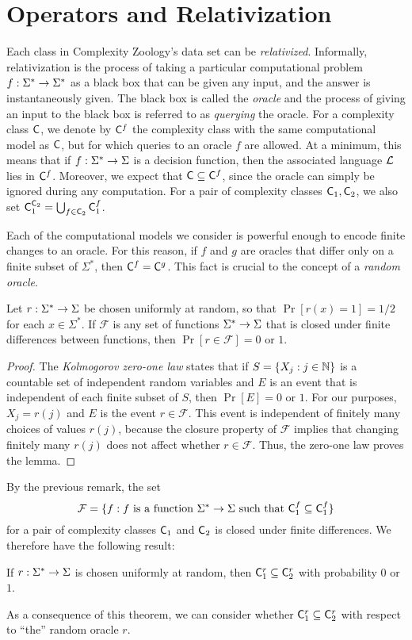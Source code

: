 \section{Operators and Relativization}

Each class in Complexity Zoology's data set can be
\textit{relativized}. Informally, relativization is the process of taking a
particular computational problem $f:\Sigma^*\rightarrow\Sigma^*$ as a black box that
can be given any input, and the answer is instantaneously given. The black box
is called the \textit{oracle} and the process of giving an input to the black
box is referred to as \textit{querying} the oracle. For a complexity class
$\mathsf{C}$, we denote by $\mathsf{C}^f$ the complexity class with the same computational
model as $\mathsf{C}$, but for which queries to an oracle $f$ are allowed. At a
minimum, this means that if $f:\Sigma^*\rightarrow\Sigma$ is a decision function, then
the associated language $\mathcal{L}$ lies in $\mathsf{C}^f$. Moreover, we expect that
$\mathsf{C}\subseteq\mathsf{C}^f$, since the oracle can simply be ignored during any
computation. For a pair of complexity classes $\mathsf{C}_1,\mathsf{C}_2$, we also set 
$\mathsf{C}_1^{\mathsf{C}_2}=\bigcup_{f\in\mathsf{C}_2}\mathsf{C}_1^f$.

Each of the computational models we consider is powerful enough to encode finite
changes to an oracle. For this reason, if $f$ and $g$ are oracles that 
differ only on a finite subset of $\Sigma^*$, then $\mathsf{C}^f=\mathsf{C}^{g}$. This 
fact is crucial to the concept of a \textit{random oracle}.
\begin{lemma}
Let $r:\Sigma^*\rightarrow\Sigma$ be chosen uniformly at random, so that $\Pr[r(x)=1]=1/2$ 
for each $x\in\Sigma^*$. If $\mathcal{F}$ is any set of functions 
$\Sigma^*\rightarrow\Sigma$ that is closed under finite differences between functions, then
$\Pr[r\in\mathcal{F}]=0\text{ or }1$.
\end{lemma}
\begin{proof}
The \textit{Kolmogorov zero-one law} states that if $S=\{X_j:j\in\mathbb{N}\}$ is a 
countable set of independent random variables and $E$ is an event that is 
independent of each finite subset of $S$, then $\Pr[E]=0\text{ or }1$. For our 
purposes, $X_j=r(j)$ and $E$ is the event $r\in\mathcal{F}$. This event is 
independent of finitely many choices of values $r(j)$, because the closure property
of $\mathcal{F}$ implies that changing finitely many $r(j)$ does not affect whether
$r\in\mathcal{F}$. Thus, the zero-one law proves the lemma.
\end{proof}
By the previous remark, the set
\[
\mathcal{F}=\{f:f\text{ is a function }\Sigma^*\rightarrow\Sigma\text{ such that }
\mathsf{C}_1^f\subseteq\mathsf{C}_1^f\}
\]
for a pair of complexity classes $\mathsf{C}_1$ and $\mathsf{C}_2$ is closed under finite 
differences. We therefore have the following result:
\begin{theorem}
If $r:\Sigma^*\rightarrow\Sigma$ is chosen uniformly at random, then 
$\mathsf{C}_1^r\subseteq\mathsf{C}_2^r$ with probability $0$ or $1$.
\end{theorem}
As a consequence of this theorem, we can consider whether $\mathsf{C}_1^r\subseteq\mathsf{C}_2^r$
with respect to ``the'' random oracle $r$.

